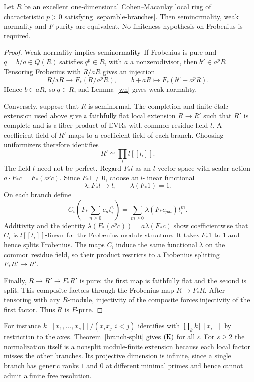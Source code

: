 \begin{corollary}\label{separable-fpure}
Let $R$ be an excellent one-dimensional Cohen--Macaulay local ring of
characteristic $p>0$ satisfying \eqref{separable-branches}.  Then
seminormality, weak normality and $F$-purity are equivalent.
No finiteness hypothesis on Frobenius is required.
\end{corollary}
\begin{proof}
Weak normality implies seminormality.  If Frobenius is pure and
$q=b/a\in Q(R)$ satisfies $q^p\in R$, with $a$ a nonzerodivisor, then
$b^p\in a^pR$.  Tensoring Frobenius with $R/aR$ gives an injection
\[
 R/aR\longrightarrow F_*(R/a^pR),\qquad
 b+aR\longmapsto F_*(b^p+a^pR).
\]
Hence $b\in aR$, so $q\in R$, and Lemma~\ref{wn} gives weak normality.

Conversely, suppose that $R$ is seminormal.  The completion and finite
\'etale extension used above give a faithfully flat local extension
$R\to R'$ such that $R'$ is complete and is a fiber product of DVRs
with common residue field $l$.  A coefficient field of $R'$ maps to
a coefficient field of each branch.  Choosing uniformizers therefore
identifies
\[
 R'\simeq\prod_l l[[t_i]].
\]
The field $l$ need not be perfect.  Regard $F_*l$ as an $l$-vector
space with scalar action $a\cdot F_*c=F_*(a^pc)$.  Since $F_*1\ne0$,
choose an $l$-linear functional
\[
 \lambda:F_*l\longrightarrow l,\qquad \lambda(F_*1)=1.
\]
On each branch define
\[
 C_i\!\left(F_*\sum_{n\geq0}c_nt_i^n\right)
   =\sum_{m\geq0}\lambda(F_*c_{pm})t_i^m.
\]
Additivity and the identity
$\lambda(F_*(a^pc))=a\lambda(F_*c)$ show coefficientwise that $C_i$
is $l[[t_i]]$-linear for the Frobenius module structure.  It takes
$F_*1$ to $1$ and hence splits Frobenius.  The maps $C_i$ induce the
same functional $\lambda$ on the common residue field, so their
product restricts to a Frobenius splitting $F_*R'\to R'$.

Finally, $R\to R'\to F_*R'$ is pure: the first map is faithfully flat
and the second is split.  This composite factors through the
Frobenius map $R\to F_*R$.  After tensoring with any $R$-module,
injectivity of the composite forces injectivity of the first factor.
Thus $R$ is $F$-pure.
\end{proof}

For instance $k[[x_1,\ldots,x_s]]/(x_ix_j:i<j)$ identifies with $\prod_k k[[x_i]]$ by restriction to the axes. Theorem~\ref{branch-split} gives $\mathrm{(K)}$ for all $s$. For $s\ge2$ the normalization itself is a nonsplit module-finite extension because each local factor misses the other branches. Its projective dimension is infinite, since a single branch has generic ranks $1$ and $0$ at different minimal primes and hence cannot admit a finite free resolution.
